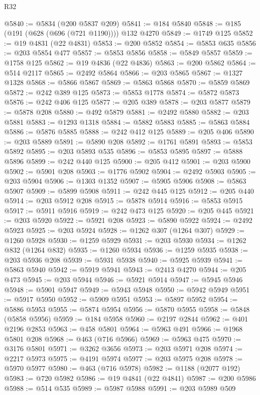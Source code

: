 \begin{lexlean}{R32}
\begin{coremodule}
@5840 := @5834 (@200 @5837 @209)
@5841 := @184 @5840
@5848 := @185 (@191 (@628 (@696 (@721 @1190)))) @132 @4270
@5849 := @1749 @125
@5852 := @19 @4831 (@22 @4831)
@5853 := @200 @5852
@5854 := @5853 @635
@5856 := @203 @5854 @477
@5857 := @5853 @5856
@5858 := @5849 @5857
@5859 := @1758 @125
@5862 := @19 @4836 (@22 @4836)
@5863 := @200 @5862
@5864 := @514 @2117
@5865 := @2492 @5864
@5866 := @203 @5865
@5867 := @1327 @1328
@5868 := @5866 @5867
@5869 := @5863 @5868
@5870 := @5859 @5869
@5872 := @242 @389 @125
@5873 := @5853 @1778
@5874 := @5872 @5873
@5876 := @242 @406 @125
@5877 := @205 @389
@5878 := @203 @5877
@5879 := @5878 @208
@5880 := @492 @5879
@5881 := @2492 @5880
@5882 := @203 @5881
@5883 := @1293 @1318
@5884 := @5882 @5883
@5885 := @5863 @5884
@5886 := @5876 @5885
@5888 := @242 @412 @125
@5889 := @205 @406
@5890 := @203 @5889
@5891 := @5890 @208
@5892 := @1761 @5891
@5893 := @5853 @5892
@5895 := @203 @5893 @535
@5896 := @5853 @5895
@5897 := @5888 @5896
@5899 := @242 @440 @125
@5900 := @205 @412
@5901 := @203 @5900
@5902 := @5901 @208
@5903 := @1776 @5902
@5904 := @2492 @5903
@5905 := @203 @5904
@5906 := @1303 @1352
@5907 := @5905 @5906
@5908 := @5863 @5907
@5909 := @5899 @5908
@5911 := @242 @445 @125
@5912 := @205 @440
@5914 := @203 @5912 @208
@5915 := @5878 @5914
@5916 := @5853 @5915
@5917 := @5911 @5916
@5919 := @242 @473 @125
@5920 := @205 @445
@5921 := @203 @5920
@5922 := @5921 @208
@5923 := @5890 @5922
@5924 := @2492 @5923
@5925 := @203 @5924
@5928 := @1262 @307 (@1264 @307)
@5929 := @1260 @5928
@5930 := @1259 @5929
@5931 := @203 @5930
@5934 := @1262 @832 (@1264 @832)
@5935 := @1260 @5934
@5936 := @1259 @5935
@5938 := @203 @5936 @208
@5939 := @5931 @5938
@5940 := @5925 @5939
@5941 := @5863 @5940
@5942 := @5919 @5941
@5943 := @2413 @4270
@5944 := @205 @473
@5945 := @203 @5944
@5946 := @5921 @5914
@5947 := @5945 @5946
@5948 := @5901 @5947
@5949 := @5943 @5948
@5950 := @5942 @5949
@5951 := @5917 @5950
@5952 := @5909 @5951
@5953 := @5897 @5952
@5954 := @5886 @5953
@5955 := @5874 @5954
@5956 := @5870 @5955
@5958 := @5848 (@5858 @5956)
@5959 := @184 @5958
@5960 := @2197 @2844
@5962 := @401 @2196 @2853
@5963 := @458 @5801
@5964 := @5963 @491
@5966 := @1968 @5801 @208
@5968 := @463 (@716 @5966)
@5969 := @5963 @475
@5970 := @3176 @5801
@5971 := @3262 @3656
@5973 := @203 @5971 @208
@5974 := @2217 @5973
@5975 := @4191 @5974
@5977 := @203 @5975 @208
@5978 := @5970 @5977
@5980 := @463 (@716 @5978)
@5982 := @1188 (@2077 @192)
@5983 := @720 @5982
@5986 := @19 @4841 (@22 @4841)
@5987 := @200 @5986
@5988 := @514 @535
@5989 := @5987 @5988
@5991 := @203 @5989 @509

\end{coremodule}
\end{lexlean}
